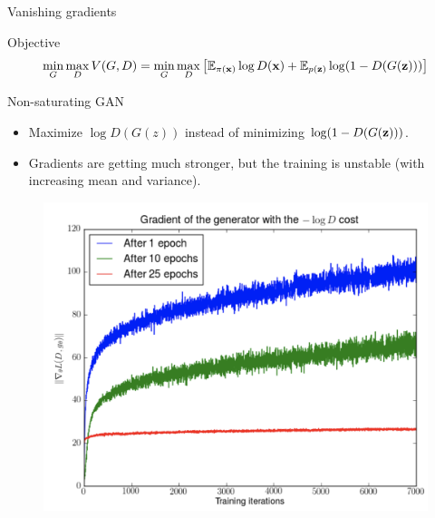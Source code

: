 \begin{frame}{Vanishing gradients}
	\begin{block}{Objective}
		\vspace{-0.4cm}
		\[
		\min_{G} \max_D V(G, D) = \min_{G} \max_D \left[ \mathbb{E}_{\pi(\mathbf{x})} \log D(\mathbf{x}) + \mathbb{E}_{p(\mathbf{z})} \log (1 - D(G(\mathbf{z}))) \right]
		\]
		\vspace{-0.4cm}
	\end{block}
	\begin{minipage}[t]{0.45\columnwidth}
		\begin{block}{Non-saturating GAN}
		\begin{itemize}
			\item Maximize $\log D(G(z))$ instead of minimizing $\log (1 - D(G(\mathbf{z})))$. \\
			\item Gradients are getting much stronger, but the training is unstable (with increasing mean and variance).
		\end{itemize}
		\end{block}
	\end{minipage}%
	\begin{minipage}[t]{0.55\columnwidth}
		\begin{figure}
			\centering
			\includegraphics[width=1.0\linewidth]{figs/vanishing_gradients_3}
		\end{figure}
	\end{minipage}
\end{frame}
